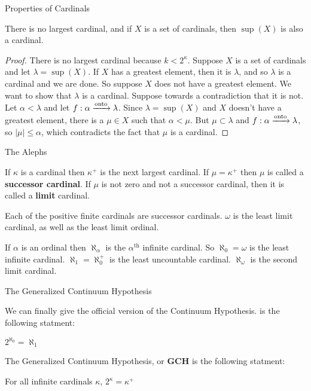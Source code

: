 \documentclass[pdf,final]{prosper}
\newcommand{\skipsmall}{\vspace{1em}}
\begin{document}
\begin{slide}{Properties of Cardinals}
\begin{lemma}
There is no largest cardinal, and if $X$ is a set of cardinals, then $\sup(X)$
is also a cardinal.
\end{lemma}
\begin{proof}
There is no largest cardinal because $k<2^{\kappa}$. Suppose $X$ is a set of
cardinals and let $\lambda=\sup(X)$. If $X$ has a greatest element, then it is
$\lambda$, and so $\lambda$ is a cardinal and we are done. So suppose $X$ does
not have a greatest element. We want to show that $\lambda$ is a cardinal.
Suppose towards a contradiction that it is not. Let $\alpha<\lambda$ and let
$f:\alpha\xrightarrow{\text{onto}}\lambda$. Since $\lambda=\sup(X)$ and $X$ doesn't have a
greatest element, there is a $\mu\in X$ such that $\alpha<\mu$. But
$\mu\subset\lambda$ and $f:\alpha\xrightarrow{\text{onto}}\lambda$, so $|\mu|\leq\alpha$,
which contradicts the fact that $\mu$ is a cardinal.
\end{proof}

\end{slide}

\begin{slide}{The Alephs}

\begin{definition}
If $\kappa$ is a cardinal then $\kappa^{+}$	is the next largest cardinal. If
$\mu=\kappa^{+}$ then $\mu$ is called a \textbf{successor cardinal}. If $\mu$ is
not zero and not a successor cardinal, then it is called a \textbf{limit}
cardinal.
\end{definition}

\skipsmall

Each of the positive finite cardinals are successor cardinals. $\omega$ is the
least limit cardinal, as well as the least limit ordinal.

\skipsmall

\begin{definition}
If $\alpha$ is an ordinal then $\aleph_{\alpha}$ is the $\alpha^{\text{th}}$
infinite cardinal. So $\aleph_0 = \omega$ is the least infinite cardinal.
$\aleph_1 = \aleph_0^{+}$ is the least uncountable cardinal. $\aleph_{\omega}$
is the second limit cardinal.
\end{definition}

\end{slide}

\begin{slide}{The Generalized Continuum Hypothesis}

We can finally give the official version of the Continuum Hypothesis. \CH is the
following statment: 

\skipsmall

$2^{\aleph_0} = \aleph_1$


\skipsmall

The Generalized Continuum Hypothesis, or \textbf{GCH} is the following statment:

\skipsmall

For all infinite cardinals $\kappa$, $2^{\kappa}=\kappa^+$

\end{slide}
\end{document}
